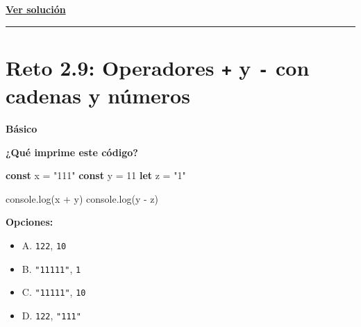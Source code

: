 \documentclass[
  letterpaper,
  DIV=11,
  numbers=noendperiod]{scrreprt}
\newenvironment{Shaded}{\begin{snugshade}}{\end{snugshade}}
\newcommand{\BuiltInTok}[1]{\textcolor[rgb]{0.00,0.23,0.31}{#1}}
\newcommand{\DecValTok}[1]{\textcolor[rgb]{0.68,0.00,0.00}{#1}}
\newcommand{\FunctionTok}[1]{\textcolor[rgb]{0.28,0.35,0.67}{#1}}
\newcommand{\KeywordTok}[1]{\textcolor[rgb]{0.00,0.23,0.31}{\textbf{#1}}}
\newcommand{\NormalTok}[1]{\textcolor[rgb]{0.00,0.23,0.31}{#1}}
\newcommand{\OperatorTok}[1]{\textcolor[rgb]{0.37,0.37,0.37}{#1}}
\newcommand{\StringTok}[1]{\textcolor[rgb]{0.13,0.47,0.30}{#1}}
\providecommand{\tightlist}{%
  \setlength{\itemsep}{0pt}\setlength{\parskip}{0pt}}
\begin{document}
\textbf{\hyperref[sec-sol-cap2-reto8]{Ver solución}}

\begin{center}\rule{0.5\linewidth}{0.5pt}\end{center}

\section{\texorpdfstring{Reto 2.9: Operadores \texttt{+} y \texttt{-}
con cadenas y
números}{Reto 2.9: Operadores + y - con cadenas y números}}\label{sec-cap2-reto9}

\begin{tcolorbox}[enhanced jigsaw, left=2mm, toprule=.15mm, leftrule=.75mm, breakable, colback=white, coltitle=black, bottomtitle=1mm, arc=.35mm, rightrule=.15mm, colframe=quarto-callout-caution-color-frame, opacitybacktitle=0.6, toptitle=1mm, opacityback=0, titlerule=0mm, title=\textcolor{quarto-callout-caution-color}{\faFire}\hspace{0.5em}{Dificultad}, bottomrule=.15mm, colbacktitle=quarto-callout-caution-color!10!white]

\textbf{Básico}

\end{tcolorbox}

\textbf{¿Qué imprime este código?}

\begin{Shaded}
\begin{Highlighting}[]
\KeywordTok{const}\NormalTok{ x }\OperatorTok{=} \StringTok{"111"}
\KeywordTok{const}\NormalTok{ y }\OperatorTok{=} \DecValTok{11}
\KeywordTok{let}\NormalTok{ z }\OperatorTok{=} \StringTok{"1"}

\BuiltInTok{console}\OperatorTok{.}\FunctionTok{log}\NormalTok{(x }\OperatorTok{+}\NormalTok{ y)}
\BuiltInTok{console}\OperatorTok{.}\FunctionTok{log}\NormalTok{(y }\OperatorTok{{-}}\NormalTok{ z)}
\end{Highlighting}
\end{Shaded}

\textbf{Opciones:}

\begin{itemize}
\tightlist
\item
  A. \texttt{122}, \texttt{10}
\item
  B. \texttt{"11111"}, \texttt{1}
\item
  C. \texttt{"11111"}, \texttt{10}
\item
  D. \texttt{122}, \texttt{"111"}
\end{itemize}
\end{document}

